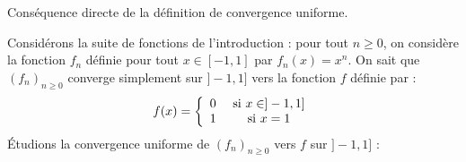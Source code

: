 \documentclass[french,11pt,twoside]{VcCours}
\begin{document}
\begin{Demonstration}{} Conséquence directe de la définition de convergence uniforme.
%
\end{Demonstration}

\medskip

\begin{Exemple} Considérons la suite de fonctions de l'introduction : pour tout $n \geq 0$, on considère la fonction $f_n$ définie pour tout $x \in [-1,1]$ par $f_n(x)=x^n$. On sait que $(f_n)_{n \geq 0}$ converge simplement sur $]-1,1]$ vers la fonction $f$ définie par :
$$ f(x) = \left\lbrace \begin{array}{ccl}
0 & \hbox{ si } x \in ]-1,1] \\
1 & \hbox{ si } x =1 \\
\end{array}\right. $$
Étudions la convergence uniforme de $(f_n)_{n \geq 0}$ vers $f$ sur $]-1,1]$ :

\vspace*{7cm}

\end{Exemple}

%
%
%
%
%
%
%
%
%
\end{document}

